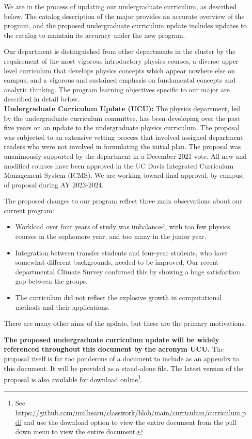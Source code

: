 \documentclass[12pt]{article}
\begin{document}
We are in the process of updating our undergraduate curriculum, as
described below.  The catalog description of the major provides an
accurate overview of the program, and the proposed undergraduate
curriculum update includes updates to the catalog to maintain its
accuracy under the new program.

Our department is distinguished from other departments in the cluster
by the requirement of the most vigorous introductory physics courses,
a diverse upper-level curriculum that develops physics concepts which
appear nowhere else on campus, and a vigorous and sustained emphasis
on fundamental concepts and analytic thinking.  The program learning
objectives specific to our major are described in detail below.\\[3pt]

\noindent
{\bf Undergraduate Curriculum Update (UCU):}
The physics department, led by the undergraduate curriculum committee,
has been developing over the past five years on an update to the
undergraduate physics curriculum.  The proposal was subjected to an
extensive vetting process that involved assigned department readers
who were not involved in formulating the initial plan.  The proposal
was unanimously supported by the department in a December 2021 vote.
All new and modified courses have been approved in the UC Davis
Integrated Curriculum Management System (ICMS).  We are working toward
final approval, by campus, of proposal during AY 2023-2024.

The proposed changes to our program reflect three main observations about our current program: 
\begin{itemize}
 \item Workload over four years of study was imbalanced, with too few physics
courses in the sophomore year, and too many in the junior year. 
 \item Integration between transfer students and
four-year students, who have somewhat different backgrounds, needed to be
improved. Our recent departmental Climate Survey confirmed this by showing a
huge satisfaction gap between the groups. 
 \item  The curriculum did not reflect the explosive growth
in computational methods and their applications.
\end{itemize}
There are many other aims of the update, but these are the primary motivations.

{\bf The proposed undergraduate curriculum update will be widely
  referenced throughout this document by the acronym UCU.}  The
proposal itself is far too ponderous of a document to include as an
appendix to this document.  It will be provided as a stand-alone file.
The latest version of the proposal is also available for download
online\footnote{See
  \href{https://github.com/mulhearn/classwork/blob/main/curriculum/curriculum.pdf}{https://github.com/mulhearn/classwork/blob/main/curriculum/curriculum.pdf}
  and use the download option to view the entire document from the
  pull down menu to view the entire document.}.\\[3pt]
\end{document}
